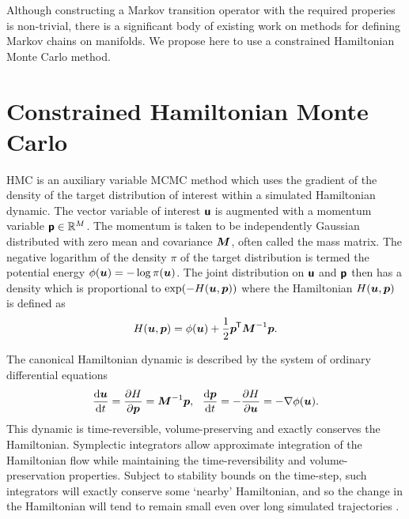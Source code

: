 
Although constructing a Markov transition operator with the required properies is non-trivial, there is a significant body of existing work on methods for defining Markov chains on manifolds. We propose here to use a constrained Hamiltonian Monte Carlo method.

\section{Constrained Hamiltonian Monte Carlo}\label{sec:chmc}

\ac{HMC} \citep{duane1987hybrid,neal2011mcmc} is an auxiliary variable \ac{MCMC} method which uses the gradient of the density of the target distribution of interest within a simulated Hamiltonian dynamic. The vector variable of interest $\boldsymbol{\mathsf{u}}$ is augmented with a momentum variable $\boldsymbol{\mathsf{p}} \in \mathit{\mathbb{R}}^M$. The momentum is taken to be independently Gaussian distributed with zero mean and covariance $\boldsymbol{M}$, often called the mass matrix. The negative logarithm of the density $\pi$ of the target distribution is termed the potential energy $\phi(\boldsymbol{u}) = -\log\pi(\boldsymbol{u})$. The joint distribution on $\boldsymbol{\mathsf{u}}$ and $\boldsymbol{\mathsf{p}}$ then has a density which is proportional to $\exp\lpa -H(\vct{u}, \vct{p})\rpa$ where the {Hamiltonian} $H(\boldsymbol{u},\boldsymbol{p})$ is defined as 
\begin{equation}\label{eq:hamiltonian}
    H(\boldsymbol{u}, \boldsymbol{p}) = 
    \phi(\boldsymbol{u}) + \frac{1}{2}\boldsymbol{p}^{\mkern-1.5mu\mathsf{T}}\boldsymbol{M}^{-1}\boldsymbol{p}.
\end{equation}

The canonical Hamiltonian dynamic is described by the system of ordinary differential equations
\begin{equation}\label{eq:hamiltonian_dynamics}
    \td{\vct{u}}{t} = \pd{H}{\vct{p}} = \mtx{M}^{-1}\vct{p},
    ~~
    \td{\vct{p}}{t} = -\pd{H}{\vct{u}} = -\grad{\phi}{\vct{u}}.
\end{equation}
This dynamic is time-reversible, volume-preserving and exactly conserves the Hamiltonian. Symplectic integrators allow approximate integration of the Hamiltonian flow while maintaining the time-reversibility and volume-preservation properties. Subject to stability bounds on the time-step, such integrators will exactly conserve some `nearby' Hamiltonian, and so the change in the Hamiltonian will tend to remain small even over long simulated trajectories \citep{leimkuhler2004simulating}. 

